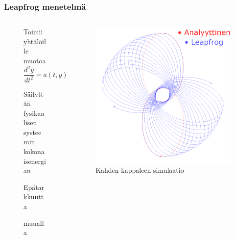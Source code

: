 \documentclass[finnish, 11pt, fleqn]{beamer}
\newcommand{\subitem}[1]{
    {\setlength\itemindent{15pt} \item[-] #1}
}
\begin{document}
\begin{frame}
	\frametitle{Leapfrog menetelmä}
	\begin{columns}[onlytextwidth]
		\begin{column}{.45\textwidth}
			\begin{figure}
				\vspace{-3em}
    			\begin{itemize}
    				\item{Toimii yhtälöille muotoa $\dfrac{d^2y}{dt^2} = a(t, y)$}
    				\vspace{1.5em}
    				\item{Säilyttää fysikaalisen systeemin kokonaisenergian}
    				\subitem{Epätarkkuutta \\}
    				\hspace{1.1em} muualla
    			\end{itemize}
			\end{figure}
		\end{column}
		\hfill
		\begin{column}{.55\textwidth}
			\begin{figure}[h!]
				\includegraphics[scale=0.7]{graphics/2kpl_prek.png}
				{\caption{Kahden kappaleen simulaatio}}
			\end{figure}
		\end{column}
	\end{columns}	
\end{frame}
\end{document}
